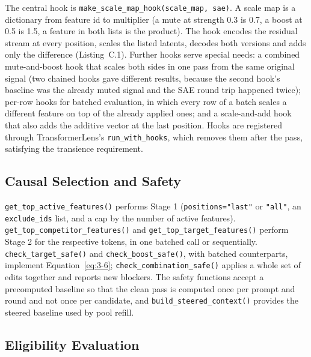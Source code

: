 \documentclass[12pt,a4paper]{report}
\begin{document}
The central hook is \texttt{make\_\allowbreak{}scale\_\allowbreak{}map\_\allowbreak{}hook(scale\_\allowbreak{}map, sae)}. A scale map is a dictionary from feature id to multiplier (a mute at strength 0.3 is 0.7, a boost at 0.5 is 1.5, a feature in both lists is the product). The hook encodes the residual stream at every position, scales the listed latents, decodes both versions and adds only the difference (Listing~C.1). Further hooks serve special needs: a combined mute-and-boost hook that scales both sides in one pass from the same original signal (two chained hooks gave different results, because the second hook's baseline was the already muted signal and the SAE round trip happened twice); per-row hooks for batched evaluation, in which every row of a batch scales a different feature on top of the already applied ones; and a scale-and-add hook that also adds the additive vector at the last position. Hooks are registered through TransformerLens's \texttt{run\_\allowbreak{}with\_\allowbreak{}hooks}, which removes them after the pass, satisfying the transience requirement.

\subsection{Causal Selection and Safety}

\texttt{get\_\allowbreak{}top\_\allowbreak{}active\_\allowbreak{}features()} performs Stage 1 (\texttt{positions="last"} or \texttt{"all"}, an \texttt{exclude\_\allowbreak{}ids} list, and a cap by the number of active features). \texttt{get\_\allowbreak{}top\_\allowbreak{}competitor\_\allowbreak{}features()} and \texttt{get\_\allowbreak{}top\_\allowbreak{}target\_\allowbreak{}features()} perform Stage 2 for the respective tokens, in one batched call or sequentially. \texttt{check\_\allowbreak{}target\_\allowbreak{}safe()} and \texttt{check\_\allowbreak{}boost\_\allowbreak{}safe()}, with batched counterparts, implement Equation~\ref{eq:3-6}; \texttt{check\_\allowbreak{}combination\_\allowbreak{}safe()} applies a whole set of edits together and reports new blockers. The safety functions accept a precomputed baseline so that the clean pass is computed once per prompt and round and not once per candidate, and \texttt{build\_\allowbreak{}steered\_\allowbreak{}context()} provides the steered baseline used by pool refill.

\subsection{Eligibility Evaluation}
\end{document}
